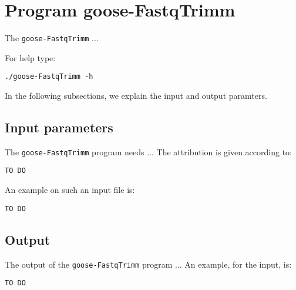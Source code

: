 \section{Program goose-FastqTrimm}
The \texttt{goose-FastqTrimm} ...

For help type:
\begin{lstlisting}
./goose-FastqTrimm -h
\end{lstlisting}
In the following subsections, we explain the input and output paramters.

\subsection*{Input parameters}

The \texttt{goose-FastqTrimm} program needs ...
The attribution is given according to:
\begin{lstlisting}
TO DO
\end{lstlisting}

An example on such an input file is:
\begin{lstlisting}
TO DO
\end{lstlisting}

\subsection*{Output}
The output of the \texttt{goose-FastqTrimm} program ...
An example, for the input, is:
\begin{lstlisting}
TO DO
\end{lstlisting}
